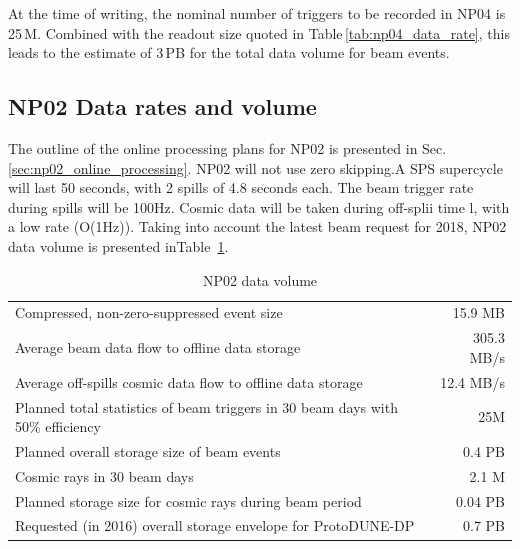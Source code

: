 \documentclass[12pt]{article}
\begin{document}
At the time of writing, the nominal number of triggers to be recorded in NP04 is 25\,M.
Combined with the readout size quoted in Table\,\ref{tab:np04_data_rate}, this leads to
the estimate of 3\,PB for the total data volume for beam events.

\subsection{NP02 Data rates and  volume}
\label{sec:np02_data_rate}
The outline of the online processing plans for NP02 is presented in Sec.\,\ref{sec:np02_online_processing}.
NP02 will not use zero skipping.A SPS supercycle will last 50 seconds, with 2 spills of 4.8 seconds each.
The beam trigger rate during spills will be 100Hz. Cosmic data will be taken during off-splii time l, with a low rate (O(1Hz)).
Taking into account the  latest beam request for 2018,  NP02 data volume  is   presented  inTable~\ref{tab:np02_data_rate}.

\begin{table}[htbp]
  \centering
  \begin{tabular}[h]{l|r}
\hline
     Compressed, non-zero-suppressed event size & 15.9 MB\\
    Average beam data flow to offline data storage &   305.3 MB/s  \\
    Average off-spills cosmic data flow to offline data storage &   12.4 MB/s\\
    Planned total statistics of beam triggers in 30 beam days with 50\% efficiency&25M\\
    Planned overall storage size of beam events&   0.4 PB\\
   Cosmic rays in 30  beam days&  2.1  M\\
   Planned storage size for cosmic rays during beam period&  0.04 PB\\
   Requested (in 2016) overall storage envelope for ProtoDUNE-DP&0.7 PB \\
    \hline
  \end{tabular}
 \caption{NP02 data volume}
  \label{tab:np02_data_rate}
\end{table}
\end{document}
